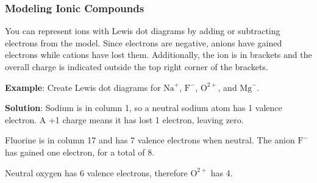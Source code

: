 \subsubsection{Modeling Ionic Compounds}
You can represent ions with Lewis dot diagrams by adding or subtracting electrons 
from the model. Since electrons are negative, anions have gained electrons while 
cations have lost them. Additionally, the ion is in brackets and the overall 
charge is indicated outside the top right corner of the brackets. 

\textbf{Example}: Create Lewis dot diagrams for $\text{Na}^{+}$, $\text{F}^{-}$, 
$\text{O}^{2+}$, and $\text{Mg}^{-}$.

\textbf{Solution}: Sodium is in column 1, so a neutral sodium atom has 1 valence 
electron. A +1 charge means it has lost 1 electron, leaving zero.

\begin{center}
\end{center}

Fluorine is in column 17 and has 7 valence electrons when neutral. The anion 
$\text{F}^-$ has gained one electron, for a total of 8. 

\begin{center}
\end{center}

Neutral oxygen has 6 valence electrons, therefore $\text{O}^{2+}$ has 4. 
\begin{center}
\end{center}

